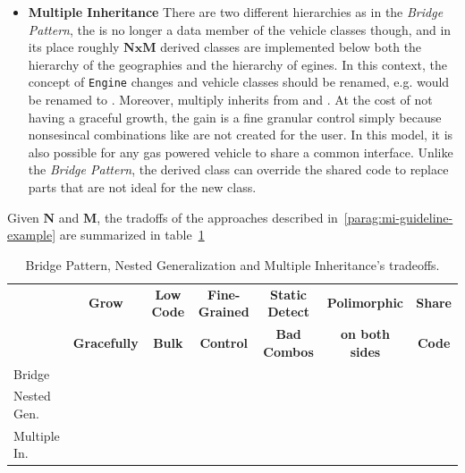 \begin{itemize}
    \item \textbf{Multiple Inheritance} \newline
    There are two different hierarchies as in the \textit{Bridge Pattern}, 
    the  is no longer a data member of the vehicle 
    classes though, and in its place roughly $\textbf{NxM}$ derived classes 
    are implemented below both the hierarchy of the geographies and the 
    hierarchy of egines.
    \newline
    In this context, the concept of \texttt{Engine} changes and vehicle 
    classes should be renamed, e.g.  would 
    be renamed to . Moreover,
     multiply inherits from 
     and . At 
    the cost of not having a graceful growth, the gain is a fine 
    granular control simply because nonsesincal combinations like 
     are not created for the user. 
    \newline 
    In this model, it is also possible for any gas powered vehicle to 
    share a common interface. Unlike the \textit{Bridge Pattern}, the 
    derived class can override the shared code to replace parts that 
    are not ideal for the new class.
\end{itemize}

Given $\textbf{N}$ and $\textbf{M}$, the tradoffs of the approaches 
described in~\ref{parag:mi-guideline-example} 
are summarized in table~\ref{tabular:tradeoffs}
\begin{table}[h!t]
    \begin{tabular}{|l|c|c|c|c|c|c|}
    \hline
    \multirow{2}{*}{}  & \textbf{Grow} & \textbf{Low Code} &\textbf{Fine-Grained} &\textbf{Static Detect} &\textbf{Polimorphic } &\textbf{Share} \\
                         & \textbf{Gracefully} & \textbf{Bulk} &\textbf{Control} &\textbf{Bad Combos} &\textbf{on both sides} &\textbf{Code} \\
    \hline 
    Bridge & \cellcolor{codegreen} & \cellcolor{codegreen}& & & & \cellcolor{codegreen}\\
    \hline                  
    Nested Gen. & & & \cellcolor{codegreen} & \cellcolor{codegreen}  & & \\
    \hline          
    Multiple In.  & & & \cellcolor{codegreen} & \cellcolor{codegreen} & \cellcolor{codegreen} & \cellcolor{codegreen} \\                  
    \hline
    \end{tabular}
    \caption{Bridge Pattern, Nested Generalization and Multiple Inheritance's tradeoffs.}
    \label{tabular:tradeoffs}
\end{table}


